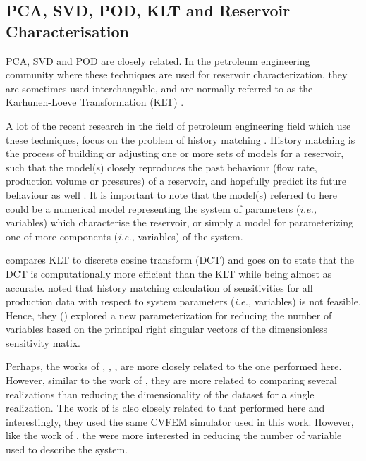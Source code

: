 \documentclass[preprint,12pt]{elsarticle}
\newcommand{\ie}{{\it i.e., }}
\begin{document}
\subsection{PCA, SVD, POD, KLT and Reservoir Characterisation}\label{section:reservoir_char}

PCA, SVD and POD are closely related. In the petroleum engineering community where these techniques are used for reservoir characterization, they are sometimes used interchangable, and are normally referred to as the Karhunen-Loeve Transformation (KLT) \cite{Jafarpour_2009}.

A lot of the recent research in the field of petroleum engineering field which use these techniques, focus on the problem of history matching \cite{Afra_2013, Insuasty_2017, Jafarpour_2009, Tavakoli_2010, Xiao_2018}. History matching is the process of building or adjusting one or more sets of models for a reservoir, such that the model(s) closely reproduces the past behaviour (flow rate, production volume or pressures) of a reservoir, and hopefully predict its future behaviour as well \cite{Rwechungura_2011}. It is important to note that the model(s) referred to here could be a numerical model representing the system of parameters (\ie{variables}) which characterise the reservoir, or simply a model for parameterizing one of more components (\ie{variables}) of the system.

\citet{Jafarpour_2009} compares KLT to discrete cosine transform (DCT) and goes on to state that the DCT is computationally more efficient than the KLT while being almost as accurate. \citet{Tavakoli_2010} noted that history matching calculation of sensitivities for all production data with respect to system parameters (\ie{variables}) is not feasible. Hence, they (\citet{Tavakoli_2010}) explored a new parameterization for reducing the number of variables based on the principal right singular vectors of the dimensionless sensitivity matix.

Perhaps, the works of \citet{Afra_2013}, \citet{Afra_2016}, \citet{Afra_2014}, \citet{Insuasty_2017} are more closely related to the one performed here. However, similar to the work of \citet{Jafarpour_2009}, they are more related to comparing several realizations than reducing the dimensionality of the dataset for a single realization. The work of \citet{Xiao_2018} is also closely related to that performed here and interestingly, they used the same CVFEM simulator used in this work. However, like the work of \citet{Tavakoli_2010}, the \citeauthor{Xiao_2018} were more interested in reducing the number of variable used to describe the system.
\end{document}
